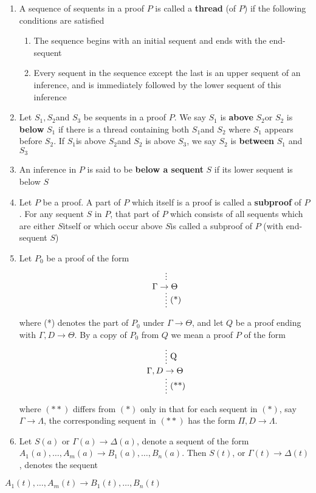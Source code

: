 \documentclass[11pt]{article}
\begin{document}
\begin{definition}[]
\begin{enumerate}
\item A sequence of sequents in a proof \(P\) is called a \textbf{thread} (of \(P\)) if
the following conditions are satisfied
\begin{enumerate}
\item The sequence begins with an initial sequent and ends with the end-sequent
\item Every sequent in the sequence except the last is an upper sequent of an
inference, and is immediately followed by the lower sequent of this inference
\end{enumerate}
\item Let \(S_1,S_2\)and \(S_3\) be sequents in a proof \(P\). We say \(S_1\)
is \textbf{above} \(S_2\)or \(S_2\) is \textbf{below} \(S_1\) if there is a thread
containing both \(S_1\)and \(S_2\) where \(S_1\) appears before
\(S_2\). If \(S_1\)is above \(S_2\)and \(S_2\) is above \(S_3\), we say
\(S_2\) is \textbf{between} \(S_1\) and \(S_3\)
\item An inference in \(P\) is said to be \textbf{below a sequent} \(S\) if its lower
sequent is below \(S\)
\item Let \(P\) be a proof. A part of \(P\) which itself is a proof is called a
\textbf{subproof} of \(P\). For any sequent \(S\) in \(P\), that part of \(P\)
which consists of all sequents which are either \(S\)itself or which occur
above \(S\)is called a subproof of \(P\) (with end-sequent \(S\))
\item Let \(P_0\) be a proof of the form
\begin{equation*}
\begin{prooftree}%
\hypo{}
\ellipsis{}{\Gamma\to\Theta}
\ellipsis{(*)}{}
\end{prooftree}
\end{equation*}
where (*) denotes the part of \(P_0\) under \(\Gamma\to\Theta\), and let
\(Q\) be a proof ending with \(\Gamma,D\to\Theta\). By a copy of \(P_0\) from
\(Q\) we mean a proof \(P\) of the form
\begin{equation*}
\begin{prooftree}%
\hypo{}
\ellipsis{Q}{\Gamma,D\to\Theta}
\ellipsis{(**)}{}
\end{prooftree}
\end{equation*}
where \((**)\) differs from \((*)\) only in that for each sequent in \((*)\),
say \(\Gamma\to\Lambda\), the corresponding sequent in \((**)\) has the
form \(\Pi,D\to\Lambda\).
\item Let \(S(a)\) or \(\Gamma(a)\to\Delta(a)\), denote a sequent of the form
\(A_1(a),\dots,A_m(a)\to B_1(a),\dots,B_n(a)\). Then \(S(t)\), or
\(\Gamma(t)\to\Delta(t)\), denotes the sequent
\end{enumerate}
\(A_1(t),\dots,A_m(t)\to B_1(t),\dots,B_n(t)\)
\end{definition}
\end{document}

